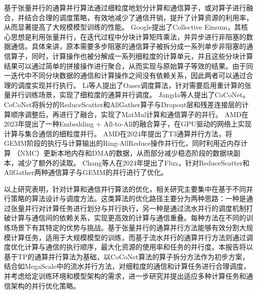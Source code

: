 基于张量并行的通算并行算法通过细粒度地划分计算和通信算子，或对算子进行融合，并结合合理的调度策略，有效地减少了通信开销，提升了计算资源的利用率，从而显著提高了大规模模型训练的性能。
Google提出了Collective Einsum\cite{wang2022overlap}，其核心思想是利用张量并行，在迭代过程中分块计算矩阵乘法，并异步进行非阻塞的数据通信。具体来讲，原本需要多步阻塞的通信算子被拆分成一系列单步非阻塞的通信算子，同时，计算操作也被分解成一系列细粒度的计算单元，并且这些分块计算结果可以通过简单的拼接操作进行聚合，从而实现与原始算子等效的结果。由于同一迭代中不同分块数据的通信和计算操作之间没有依赖关系，因此两者可以通过合理的调度实现并行执行。
Li等人\cite{li2023automated}提出了Oases调度算法，针对需要启用重计算的张量并行训练场景，实现了细粒度的通算并行调度。
Jangda等人\cite{jangda2022breaking}提出了CoCoNet。CoCoNet将拆分的ReduceScatter和AllGather算子与Dropout层和残差连接层的计算顺序调整后，再进行了融合，实现了MatMul计算和通信算子的并行。
AMD在2023年提出了一种Embedding + All-to-All的融合算子\cite{punniyamurthy2024optimizing}，在GPU驱动的网络上实现计算与集合通信的细粒度并行。
AMD在2024年提出了T3通算并行方法\cite{pati2024t3}，将GEMM阶段的执行与计算输出的Ring-AllReduce操作并行化，同时利用近内存计算 （NMC）更新本地内存和DMA的数据，从而部分减少稳态阶段的数据块副本，减少了额外的读取。
Chang等人\cite{chang2024flux}在2024年提出了Flux，针对ReduceScatter和AllGather两种通信算子与GEMM的并行进行了优化。

以上研究表明，针对计算和通信并行算法的优化，相关研究主要集中在基于不同并行策略的算法设计与调度方法。这类算法的优化路径主要分为两种思路：一种是通过张量并行对计算任务进行划分与并行执行，另一种是通过流水并行的调度机制打破计算与通信间的依赖关系，实现更高效的计算与通信重叠。每种方法在不同的训练场景下有其特定的优势与挑战。基于张量并行的通算并行方法能够有效分割大规模计算任务，适用于大规模模型的训练，而基于流水并行的通算并行方法则通过调度优化计算与通信的执行顺序，最大化资源的使用率和任务的并行度。本报告将以基于TP的通算并行算法为基础，以CoCoNet算法的算子拆分方法作为初步方案，结合如MegaScale中的流水并行方法，对细粒度的通信和计算任务进行合理调度，并考虑给定训练环境和模型架构的需求，进一步研究并提出适应多种计算任务和通信架构的并行优化策略。



